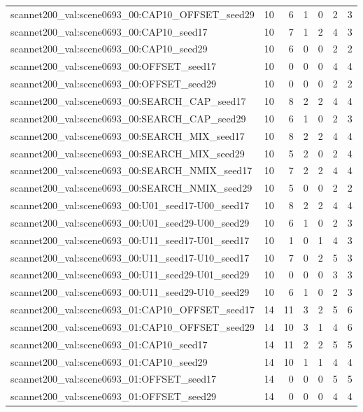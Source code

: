 \begin{table}[t]
\begin{tabular}{lrrrrrr}
scannet200\_val:scene0693\_00:CAP10\_OFFSET\_seed29 & 10 & 6 & 1 & 0 & 2 & 3 \\
scannet200\_val:scene0693\_00:CAP10\_seed17 & 10 & 7 & 1 & 2 & 4 & 3 \\
scannet200\_val:scene0693\_00:CAP10\_seed29 & 10 & 6 & 0 & 0 & 2 & 2 \\
scannet200\_val:scene0693\_00:OFFSET\_seed17 & 10 & 0 & 0 & 0 & 4 & 4 \\
scannet200\_val:scene0693\_00:OFFSET\_seed29 & 10 & 0 & 0 & 0 & 2 & 2 \\
scannet200\_val:scene0693\_00:SEARCH\_CAP\_seed17 & 10 & 8 & 2 & 2 & 4 & 4 \\
scannet200\_val:scene0693\_00:SEARCH\_CAP\_seed29 & 10 & 6 & 1 & 0 & 2 & 3 \\
scannet200\_val:scene0693\_00:SEARCH\_MIX\_seed17 & 10 & 8 & 2 & 2 & 4 & 4 \\
scannet200\_val:scene0693\_00:SEARCH\_MIX\_seed29 & 10 & 5 & 2 & 0 & 2 & 4 \\
scannet200\_val:scene0693\_00:SEARCH\_NMIX\_seed17 & 10 & 7 & 2 & 2 & 4 & 4 \\
scannet200\_val:scene0693\_00:SEARCH\_NMIX\_seed29 & 10 & 5 & 0 & 0 & 2 & 2 \\
scannet200\_val:scene0693\_00:U01\_seed17-U00\_seed17 & 10 & 8 & 2 & 2 & 4 & 4 \\
scannet200\_val:scene0693\_00:U01\_seed29-U00\_seed29 & 10 & 6 & 1 & 0 & 2 & 3 \\
scannet200\_val:scene0693\_00:U11\_seed17-U01\_seed17 & 10 & 1 & 0 & 1 & 4 & 3 \\
scannet200\_val:scene0693\_00:U11\_seed17-U10\_seed17 & 10 & 7 & 0 & 2 & 5 & 3 \\
scannet200\_val:scene0693\_00:U11\_seed29-U01\_seed29 & 10 & 0 & 0 & 0 & 3 & 3 \\
scannet200\_val:scene0693\_00:U11\_seed29-U10\_seed29 & 10 & 6 & 1 & 0 & 2 & 3 \\
scannet200\_val:scene0693\_01:CAP10\_OFFSET\_seed17 & 14 & 11 & 3 & 2 & 5 & 6 \\
scannet200\_val:scene0693\_01:CAP10\_OFFSET\_seed29 & 14 & 10 & 3 & 1 & 4 & 6 \\
scannet200\_val:scene0693\_01:CAP10\_seed17 & 14 & 11 & 2 & 2 & 5 & 5 \\
scannet200\_val:scene0693\_01:CAP10\_seed29 & 14 & 10 & 1 & 1 & 4 & 4 \\
scannet200\_val:scene0693\_01:OFFSET\_seed17 & 14 & 0 & 0 & 0 & 5 & 5 \\
scannet200\_val:scene0693\_01:OFFSET\_seed29 & 14 & 0 & 0 & 0 & 4 & 4 \\

\end{tabular}
\end{table}

